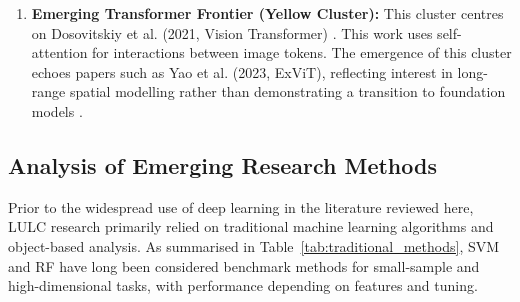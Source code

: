 \documentclass[]{interact}
\theoremstyle{plain}%
\theoremstyle{definition}
\theoremstyle{remark}
\DeclareRobustCommand{\DIFadd}[1]{{\protect\color{DIFaddcolor}\uwave{#1}}}
\DeclareRobustCommand{\DIFdel}[1]{{\protect\color{DIFdelcolor}\sout{#1}}}
\def\DIFadd#1{#1}%
\def\DIFdel#1{}%
\begin{document}
\begin{enumerate}
	\item \textbf{Emerging Transformer Frontier (Yellow Cluster):} \DIFdel{Representing} \DIFdel{the} \DIFdel{latest} \DIFdel{paradigm} \DIFdel{shift}\DIFdel{,} \DIFdel{this} \DIFadd{This} cluster \DIFdel{centers} \DIFadd{centres} on Dosovitskiy et al. (2021, Vision Transformer) \citep{35}. \DIFdel{It} \DIFdel{marks} \DIFdel{the} \DIFdel{transition} \DIFdel{from} \DIFdel{local} \DIFdel{convolutional} \DIFdel{operations} \DIFdel{to} \DIFdel{global} \DIFdel{attention} \DIFdel{mechanisms} \DIFadd{This} \DIFadd{work} \DIFadd{uses} \DIFadd{self-attention} \DIFadd{for} \DIFadd{interactions} \DIFadd{between} \DIFadd{image} \DIFadd{tokens}. The emergence of this cluster echoes \DIFdel{recent} \DIFdel{high-impact} papers such as Yao et al. (2023, ExViT), \DIFdel{indicating} \DIFdel{that} \DIFdel{the} \DIFdel{field} \DIFdel{is} \DIFdel{actively} \DIFdel{moving} \DIFdel{toward} \DIFdel{an} \DIFdel{era} \DIFdel{of} \DIFadd{reflecting} \DIFadd{interest} \DIFadd{in} \DIFadd{long-range} \DIFadd{spatial} \DIFadd{modelling} \DIFadd{rather} \DIFadd{than} \DIFadd{demonstrating} \DIFadd{a} \DIFadd{transition} \DIFadd{to} foundation models \DIFdel{capable} \DIFdel{of} \DIFdel{long-range} \DIFdel{spatial} \DIFdel{modeling} \DIFdel{of} \DIFdel{complex} \DIFdel{earth} \DIFdel{surfaces} \citep{36}.
\end{enumerate}

\subsection{Analysis of Emerging Research Methods}
Prior to the \DIFdel{dominance} \DIFadd{widespread} \DIFadd{use} of deep learning \DIFadd{in} \DIFadd{the} \DIFadd{literature} \DIFadd{reviewed} \DIFadd{here}, LULC research primarily relied on traditional machine learning algorithms and object-based analysis. As \DIFdel{summarized} \DIFadd{summarised} in Table~\ref{tab:traditional_methods}, SVM and RF have long been considered benchmark methods \DIFdel{due} \DIFdel{to} \DIFdel{their} \DIFdel{robustness} \DIFdel{with} \DIFdel{small} \DIFdel{samples} \DIFadd{for} \DIFadd{small-sample} and high-dimensional \DIFdel{data} \DIFadd{tasks}\DIFadd{,} \DIFadd{with} \DIFadd{performance} \DIFadd{depending} \DIFadd{on} \DIFadd{features} \DIFadd{and} \DIFadd{tuning}.
\end{document}
